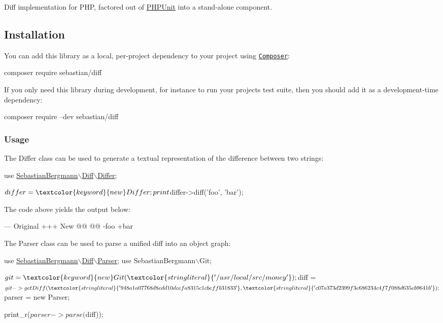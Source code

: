 Diff implementation for P\+HP, factored out of \mbox{\hyperlink{namespace_p_h_p_unit}{P\+H\+P\+Unit}} into a stand-\/alone component.

\subsection*{Installation}

You can add this library as a local, per-\/project dependency to your project using \href{https://getcomposer.org/}{\tt Composer}\+: \begin{DoxyVerb}composer require sebastian/diff
\end{DoxyVerb}


If you only need this library during development, for instance to run your project\textquotesingle{}s test suite, then you should add it as a development-\/time dependency\+: \begin{DoxyVerb}composer require --dev sebastian/diff
\end{DoxyVerb}


\subsubsection*{Usage}

The {\ttfamily Differ} class can be used to generate a textual representation of the difference between two strings\+:


\begin{DoxyCode}
use \mbox{\hyperlink{namespace_sebastian_bergmann_1_1_diff_1_1_differ}{SebastianBergmann\(\backslash\)Diff\(\backslash\)Differ}};

$differ = \textcolor{keyword}{new} Differ;
print $differ->diff(\textcolor{stringliteral}{'foo'}, \textcolor{stringliteral}{'bar'});
\end{DoxyCode}


The code above yields the output below\+: \begin{DoxyVerb}--- Original
+++ New
@@ @@
-foo
+bar
\end{DoxyVerb}


The {\ttfamily Parser} class can be used to parse a unified diff into an object graph\+:


\begin{DoxyCode}
use \mbox{\hyperlink{class_sebastian_bergmann_1_1_diff_1_1_parser}{SebastianBergmann\(\backslash\)Diff\(\backslash\)Parser}};
use SebastianBergmann\(\backslash\)Git;

$git = \textcolor{keyword}{new} Git(\textcolor{stringliteral}{'/usr/local/src/money'});

$diff = $git->getDiff(
  \textcolor{stringliteral}{'948a1a07768d8edd10dcefa8315c1cbeffb31833'},
  \textcolor{stringliteral}{'c07a373d2399f3e686234c4f7f088d635eb9641b'}
);

$parser = \textcolor{keyword}{new} Parser;

print\_r($parser->parse($diff));
\end{DoxyCode}


